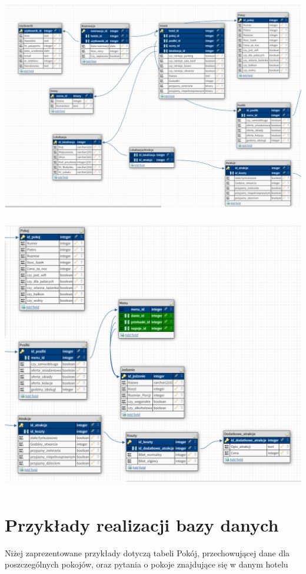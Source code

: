 \documentclass[12pt,a4paper]{article}
\begin{document}
\includegraphics[angle=0,width=160mm,height=100mm]{img/erd3.png}
\newline
\includegraphics[angle=0,width=150mm,height=120mm]{img/erd4.png}

\section{Przykłady realizacji bazy danych}
\label{sec:ExamplesSection}
Niżej zaprezentowane przykłady dotyczą tabeli Pokój, przechowującej dane dla poszczególnych pokojów, oraz pytania o pokoje znajdujące się w danym hotelu
\end{document}
